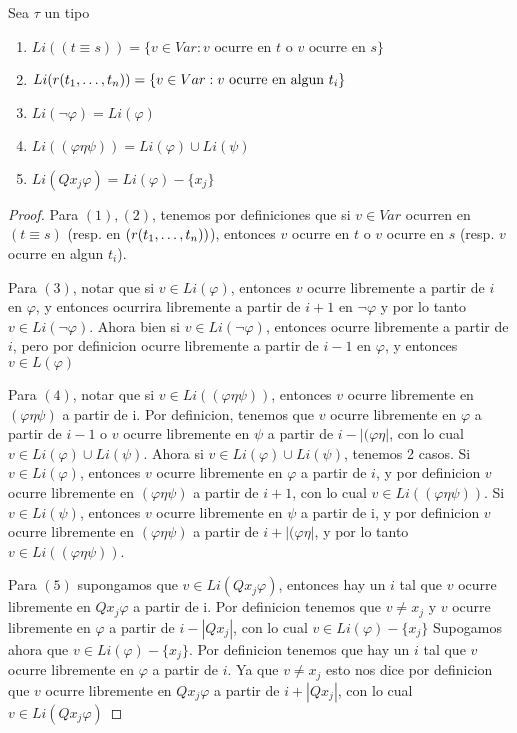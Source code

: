 \begin{lemma}
  Sea $\tau$ un tipo
  \begin{enumerate}
    \item $Li((t\equiv s)) = \{v \in Var : v \text{ ocurre en } t \text{ o } v \text{ ocurre en } s\}$
    \item $Li(r(t_{1}, \dots, t_{n})) = \{v \in Var : v \text{ ocurre en algun } t_i\}$
    \item $Li(\neg\varphi) = Li(\varphi)$
    \item $Li((\varphi\eta\psi)) = Li(\varphi) \cup Li(\psi)$
    \item $Li(Qx_j\varphi) = Li(\varphi) - \{x_j\}$
  \end{enumerate}
\end{lemma}
\begin{proof}
  Para $(1), (2)$, tenemos por definiciones que si $v\in Var$ ocurren en $(t\equiv s)$ (resp. en $(r(t_{1}, \dots, t_{n}))$), entonces 
  $v$ ocurre en $t$ o $v$ ocurre en $s$ (resp. $v$ ocurre en algun $t_i$).

  Para $(3)$, notar que si $v \in Li(\varphi)$, entonces $v$ ocurre libremente a partir de $i$ en $\varphi$, y entonces ocurrira libremente a partir de $i+1$ en $\neg\varphi$
  y por lo tanto $v \in Li(\neg\varphi)$. Ahora bien si $v \in Li(\neg\varphi)$, entonces ocurre libremente a partir de $i$, pero por definicion ocurre libremente a partir de $i-1$ en $\varphi$, y entonces $v \in L(\varphi)$

  Para $(4)$, notar que si $v \in Li((\varphi\eta\psi))$, entonces $v$ ocurre libremente en $(\varphi\eta\psi)$ a partir de i. Por definicion, tenemos que $v$ ocurre libremente en $\varphi$ a partir de $i-1$ o 
  $v$ ocurre libremente en $\psi$ a partir de $i - |(\varphi\eta|$, con lo cual $v\in Li(\varphi)\cup Li(\psi)$.
  Ahora si $v \in Li(\varphi)\cup Li(\psi)$, tenemos 2 casos. Si $v \in Li(\varphi)$, entonces $v$ ocurre libremente en $\varphi$ a partir de $i$, y por definicion 
  $v$ ocurre libremente en $(\varphi\eta\psi)$ a partir de $i+1$, con lo cual $v \in Li((\varphi\eta\psi))$. Si $v\in Li(\psi)$, entonces $v$ ocurre libremente en $\psi$ a partir de i, y por definicion
  $v$ ocurre libremente en $(\varphi\eta\psi)$ a partir de $i+|(\varphi\eta|$, y por lo tanto $v \in Li((\varphi\eta\psi))$.

  Para $(5)$ supongamos que $v\in Li(Q x_j \varphi)$, entonces hay un $i$ tal que $v$ ocurre libremente 
  en $Q x_j \varphi$ a partir de i. Por definicion tenemos que $v \neq x_j$ y $v$ ocurre libremente en $\varphi$ a partir de $i - |Q x_j|$, con lo cual $v \in Li(\varphi) - \{x_j\}$
  Supogamos ahora que $v \in Li(\varphi) - \{x_j\}$. Por definicion tenemos que hay un $i$ tal que $v$ ocurre libremente en $\varphi$ a partir de $i$. Ya que $v \neq x_j$ esto 
  nos dice por definicion que $v$ ocurre libremente en $Q x_j \varphi$ a partir de $i + |Q x_j|$, con lo cual $v \in Li(Q x_j \varphi)$
\end{proof}

